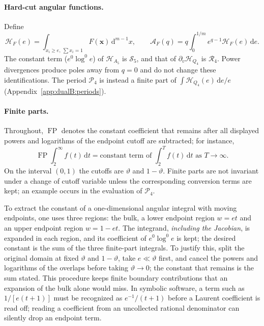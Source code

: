 \documentclass[11pt,a4paper]{article}
\numberwithin{equation}{section}
\newcommand{\dd}{\,\mathrm d}
\newcommand{\FP}{\operatorname{FP}}
\begin{document}
\paragraph{Hard-cut angular functions.} Define
\begin{equation}
 \mathcal H_F(e)=\int_{x_i\ge e,\ \sum x_i=1}F(\boldsymbol x)\dd^{m-1}x,\qquad
 \mathcal A_F(q)=q\int_0^{1/m}e^{q-1}\mathcal H_F(e)\dd e.
 \label{eq:dualB:angularH}
\end{equation}
The constant term ($e^0\log^0e$) of $\mathcal H_{A_5}$ is $\mathcal S_5$, and that of $\partial_v\mathcal H_{Q_4}$ is
$\mathcal R_4$. Power divergences produce poles away from $q=0$ and do not change these identifications. The period
$\mathcal P_4$ is instead a finite part of $\int\mathcal H_{Q_4}(e)\dd e/e$ (Appendix~\ref{app:dualB:periods}).

\paragraph{Finite parts.} Throughout, $\FP$ denotes the constant coefficient that remains after all displayed powers
and logarithms of the endpoint cutoff are subtracted; for instance,
\begin{equation}
 \FP\!\int_2^\infty f(t)\dd t=\text{constant term of }\int_2^Tf(t)\dd t\text{ as }T\to\infty.
 \label{eq:dualB:FPdef}
\end{equation}
On the interval $(0,1)$ the cutoffs are $\vartheta$ and $1-\vartheta$. Finite parts are not invariant under a change of
cutoff variable unless the corresponding conversion terms are kept; an example occurs in the evaluation of
$\mathcal P_4$.

To extract the constant of a one-dimensional angular integral with moving endpoints, one uses three regions: the bulk,
a lower endpoint region $w=et$ and an upper endpoint region $w=1-et$. The integrand, \emph{including the Jacobian}, is
expanded in each region, and its coefficient of $e^0\log^0e$ is kept; the desired constant is the sum of the three
finite-part integrals. To justify this, split the original domain at fixed $\vartheta$ and $1-\vartheta$, take
$e\ll\vartheta$ first, and cancel the powers and logarithms of the overlaps before taking $\vartheta\to0$; the constant
that remains is the sum stated. This procedure keeps finite boundary contributions that an expansion of the bulk alone
would miss. In symbolic software, a term such as $1/[e(t+1)]$ must be recognized as $e^{-1}/(t+1)$ before a Laurent
coefficient is read off; reading a coefficient from an uncollected rational denominator can silently drop an endpoint
term.
\end{document}
